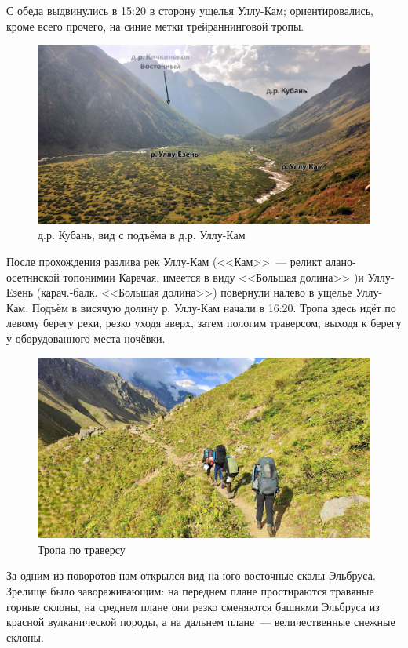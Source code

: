 С обеда выдвинулись в 15:20 в сторону ущелья Уллу-Кам; ориентировались, кроме всего прочего, на синие метки трейраннинговой тропы.

\begin{figure}[h!]
	\centering
	\includegraphics[width=0.7\linewidth]{../pics/DSC_0464 2.JPG}
	\caption{д.р. Кубань, вид с подъёма в д.р. Уллу-Кам}
	\label{fig:DSC_0464 2.JPG}
\end{figure}

После прохождения разлива рек Уллу-Кам (<<Кам>>~--- реликт алано-осетннской топонимии Карачая, имеется в виду <<Большая долина>> \cite{proza})и Уллу-Езень (карач.-балк. <<Большая долина>>) повернули налево в ущелье Уллу-Кам. Подъём в висячую долину р. Уллу-Кам начали в 16:20. Тропа здесь идёт по левому берегу реки, резко уходя вверх, затем пологим траверсом, выходя к берегу у оборудованного места ночёвки.


\begin{figure}[h!]
	\centering
	\includegraphics[width=0.7\linewidth]{../pics/IMG_20240829_170756.jpg}
	\caption{Тропа по траверсу}
	\label{fig:IMG_20240829_170756.jpg}
\end{figure}

За одним из поворотов нам открылся вид на юго-восточные скалы Эльбруса. Зрелище было завораживающим: на переднем плане простираются травяные горные склоны, на среднем плане они резко сменяются башнями Эльбруса из красной вулканической породы, а на дальнем плане~--- величественные снежные склоны.

